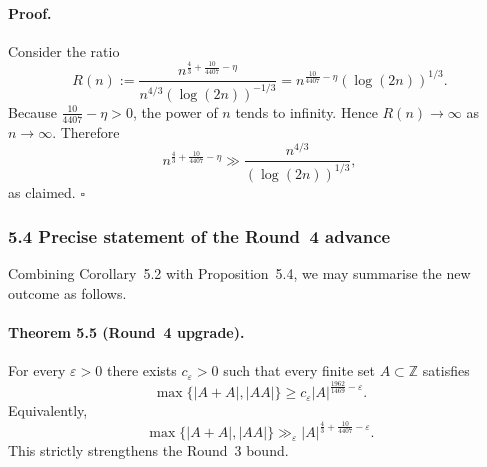 \paragraph{Proof.}
Consider the ratio
\[
R(n):=
\frac{n^{\frac43+\frac{10}{4407}-\eta}}{n^{4/3}(\log(2n))^{-1/3}}
=
 n^{\frac{10}{4407}-\eta}(\log(2n))^{1/3}.
\]
Because $\frac{10}{4407}-\eta>0$, the power of $n$ tends to infinity. Hence $R(n)\to\infty$ as $n\to\infty$. Therefore
\[
n^{\frac43+\frac{10}{4407}-\eta}
\gg
\frac{n^{4/3}}{(\log(2n))^{1/3}},
\]
as claimed.
\hfill $\square$

\subsubsection{5.4 Precise statement of the Round~4 advance}
Combining Corollary~5.2 with Proposition~5.4, we may summarise the new outcome as follows.

\paragraph{Theorem 5.5 (Round~4 upgrade).}
For every $\varepsilon>0$ there exists $c_{\varepsilon}>0$ such that every finite set $A\subset\mathbb Z$ satisfies
\[
\max\{|A+A|,|AA|\}\ge c_{\varepsilon}|A|^{\frac{1962}{1469}-\varepsilon}.
\]
Equivalently,
\[
\max\{|A+A|,|AA|\}\gg_{\varepsilon}|A|^{\frac43+\frac{10}{4407}-\varepsilon}.
\]
This strictly strengthens the Round~3 bound.

